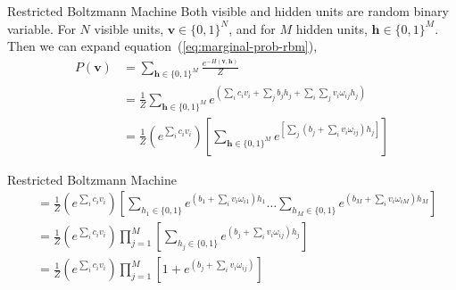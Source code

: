 \begin{frame}{Restricted Boltzmann Machine}
    \justifying%
    Both visible and hidden units are random binary variable. For $N$ visible units, $\mathbf{v} \in {\{0, 1\}}^{N}$, and for $M$ hidden units, $\mathbf{h} \in {\{0, 1\}}^{M}$. Then we can expand equation~(\ref{eq:marginal-prob-rbm}), 
    \begin{align}
        P(\mathbf{v}) &= \sum_{\mathbf{h} \in {\{0, 1\}}^{M}} \frac{e^{-H(\mathbf{v}, \mathbf{h})}}{Z} \nonumber \\
        &= \frac{1}{Z} \sum_{\mathbf{h} \in {\{0, 1\}}^{M}} e^{\left(\sum_{i} c_{i} v_{i} + \sum_{j} b_{j} h_{j} + \sum_{i}\sum_{j} v_{i} \omega_{ij} h_{j} \right)} \nonumber \\
        &= \frac{1}{Z} \left(e^{\sum_{i} c_{i} v_{i}}\right) \left[\sum_{\mathbf{h} \in {\{0, 1\}}^{M}} e^{\left[\sum_{j} \left(b_{j} + \sum_{i} v_{i} \omega_{ij} \right) h_{j}\right]}\right] \nonumber
    \end{align}
\end{frame}


\begin{frame}{Restricted Boltzmann Machine}
    \justifying%
    \begin{align}
        &= \frac{1}{Z} \left(e^{\sum_{i} c_{i} v_{i}}\right) \left[\sum_{h_{1} \in {\{0, 1\}}} e^{\left(b_{1} + \sum_{i} v_{i} \omega_{i1} \right) h_{1}} \dots \sum_{h_{M} \in {\{0, 1\}}} e^{\left(b_{M} + \sum_{i} v_{i} \omega_{iM} \right) h_{M}}\right] \nonumber \\
        &= \frac{1}{Z} \left(e^{\sum_{i} c_{i} v_{i}}\right) \prod^{M}_{j=1} \left[\sum_{h_{j} \in \{0, 1\}} e^{\left(b_{j} + \sum_{i} v_{i} \omega_{ij} \right) h_{j}}\right] \nonumber \\
        &= \frac{1}{Z} \left(e^{\sum_{i} c_{i} v_{i}}\right) \prod^{M}_{j=1} \left[1 + e^{\left(b_{j} + \sum_{i} v_{i} \omega_{ij} \right)} \right] \nonumber 
    \end{align}
\end{frame}



